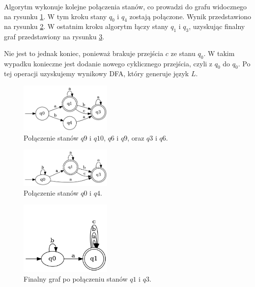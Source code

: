 Algorytm wykonuje kolejne połączenia stanów, co prowadzi do grafu widocznego na rysunku \ref{fig:pta06}. W tym kroku stany \( q_0 \) i \( q_4 \) zostają połączone. Wynik przedstawiono na rysunku \ref{fig:pta07}. W ostatnim kroku algorytm łączy stany \( q_1 \) i \( q_3 \), uzyskując finalny graf przedstawiony na rysunku \ref{fig:pta08}. 

Nie jest to jednak koniec, ponieważ brakuje przejścia \( c \) ze stanu \( q_0 \). W takim wypadku konieczne jest dodanie nowego cyklicznego przejścia, czyli z \( q_0 \) do \( q_0 \). Po tej operacji uzyskujemy wynikowy DFA, który generuje język \( L \).

\begin{figure}[ht]
    \centering
    \includegraphics[width=0.4\textwidth]{images/run_example/rpni/6.png}
    \caption{Połączenie stanów \( q9 \) i \( q10 \), \( q6 \) i \( q9 \), oraz \( q3 \) i \( q6 \).}
    \label{fig:pta06}
\end{figure}

\begin{figure}[ht]
    \centering
    \includegraphics[width=0.4\textwidth]{images/run_example/rpni/7.png}
    \caption{Połączenie stanów \( q0 \) i \( q4 \).}
    \label{fig:pta07}
\end{figure}

\begin{figure}[ht]
    \centering
    \includegraphics[width=0.4\textwidth]{images/run_example/rpni/8.png}
    \caption{Finalny graf po połączeniu stanów \( q1 \) i \( q3 \).}
    \label{fig:pta08}
\end{figure}
